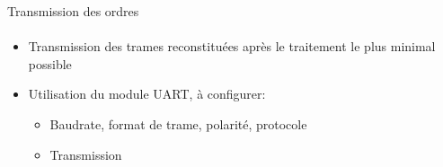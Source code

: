 \begin{frame}
  \tableofcontents[currentsection]
\end{frame}

\begin{frame}{Transmission des ordres}
\framesubtitle{}
\begin{itemize}
  \item Transmission des trames reconstituées après le traitement le plus minimal possible
  \item Utilisation du module UART, à configurer:
  \begin{itemize}
    \item Baudrate, format de trame, polarité, protocole
    \item Transmission
  \end{itemize}

\end{itemize}
\end{frame}

